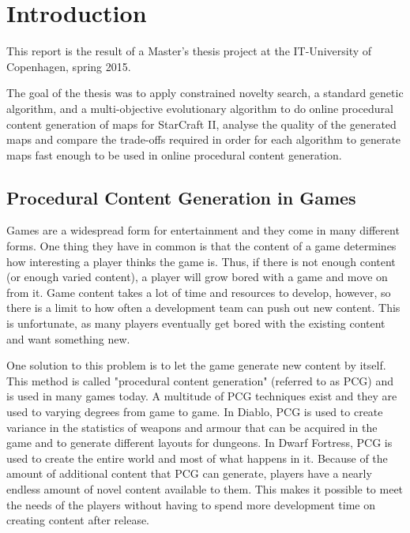 \chapter{Introduction}
\label{introduction}

This report is the result of a Master's thesis project at the IT-University of Copenhagen, spring 2015.

The goal of the thesis was to apply constrained novelty search, a standard genetic algorithm, and a multi-objective evolutionary algorithm to do online\cite{shaker2015procedural} procedural content generation of maps for StarCraft II, analyse the quality of the generated maps and compare the trade-offs required in order for each algorithm to generate maps fast enough to be used in online procedural content generation.

\section{Procedural Content Generation in Games}
\label{introduction_pcg}

Games are a widespread form for entertainment and they come in many different forms. One thing they have in common is that the content of a game determines how interesting a player thinks the game is. Thus, if there is not enough content (or enough varied content), a player will grow bored with a game and move on from it. Game content takes a lot of time and resources to develop, however, so there is a limit to how often a development team can push out new content. This is unfortunate, as many players eventually get bored with the existing content and want something new.

One solution to this problem is to let the game generate new content by itself. This method is called "procedural content generation" (referred to as PCG) and is used in many games today. A multitude of PCG techniques exist and they are used to varying degrees from game to game. In Diablo\cite{diablo3}, PCG is used to create variance in the statistics of weapons and armour that can be acquired in the game and to generate different layouts for dungeons. In Dwarf Fortress\cite{dwarffortress}, PCG is used to create the entire world and most of what happens in it. Because of the amount of additional content that PCG can generate, players have a nearly endless amount of novel content available to them. This makes it possible to meet the needs of the players without having to spend more development time on creating content after release.

